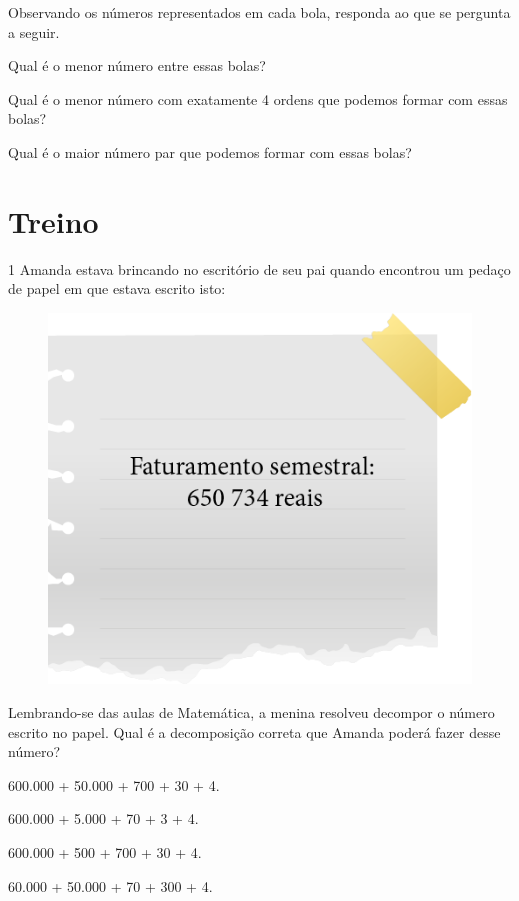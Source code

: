 Observando os números representados em cada bola, responda ao que se pergunta a seguir.

\begin{escolha}
\item
  Qual é o menor número entre essas bolas? 

\item
  Qual é o menor número com exatamente 4 ordens que podemos formar com essas bolas? 

\item
  Qual é o maior número par que podemos formar com essas bolas? 
\end{escolha}


\section{Treino}

\num{1} Amanda estava brincando no escritório de seu pai quando encontrou um
pedaço de papel em que estava escrito isto:

\begin{figure}[htpb!]
\centering
\includegraphics[width=.4\textwidth]{media/image8.png}
\end{figure}

\pagebreak
Lembrando-se das aulas de Matemática, a menina resolveu decompor o número escrito
no papel. Qual é a decomposição correta que Amanda poderá fazer desse
número?

\begin{escolha}
\item
  600.000 + 50.000 + 700 + 30 + 4.
\item
  600.000 + 5.000 + 70 + 3 + 4.
\item
  600.000 + 500 + 700 + 30 + 4.
\item
  60.000 + 50.000 + 70 + 300 + 4.
\end{escolha}


